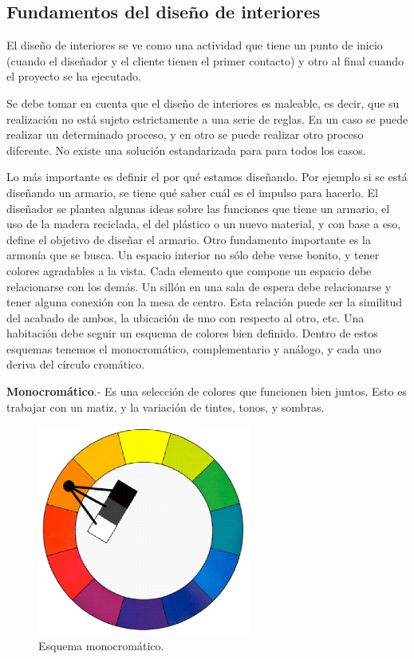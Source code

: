 \subsection{Fundamentos del diseño de interiores}
El diseño de interiores se ve como una actividad que tiene un punto de inicio (cuando el diseñador y el cliente tienen el primer contacto) y otro al final cuando el proyecto se ha ejecutado.\par
Se debe tomar en cuenta que el diseño de interiores es maleable, es decir, que su realización no está sujeto estrictamente a una serie de reglas. En un caso se puede realizar un determinado proceso, y en otro se puede realizar otro proceso diferente. No existe una solución estandarizada para para todos los casos.\par
Lo más importante es definir el por qué estamos diseñando. Por ejemplo si se está diseñando un armario, se tiene qué saber cuál es el impulso para hacerlo. El diseñador se plantea algunas ideas sobre las funciones que tiene un armario, el uso de la madera reciclada, el del plástico o un nuevo material, y con base a eso, define el objetivo de diseñar el armario.
Otro fundamento importante es la armonía que se busca. Un espacio interior no sólo debe verse bonito, y tener colores agradables a la vista. Cada elemento que compone un espacio debe relacionarse con los demás. Un sillón en una sala de espera debe relacionarse y tener alguna conexión con la mesa de centro. Esta relación puede ser la similitud del acabado de ambos, la ubicación de uno con respecto al otro, etc.
Una habitación debe seguir un esquema de colores bien definido. Dentro de estos esquemas tenemos el monocromático, complementario y análogo, y cada uno deriva del círculo cromático.\par

\textbf{Monocromático}.- Es una selección de colores que funcionen bien juntos. Esto es trabajar con un matiz, y la variación de tintes, tonos, y sombras.
\begin{figure}[h!]
	\centering
	\includegraphics[width=7cm]{imagenes/marcoteorico/disenointeriores/monocromatico.png}
	\caption{Esquema monocromático.\cite{B13}}
	\label{fig:monocromatico}
\end{figure}

